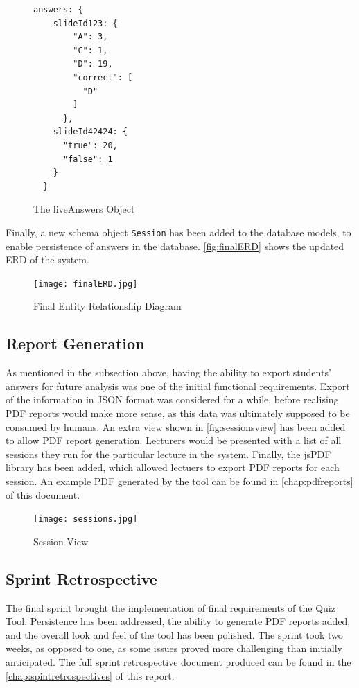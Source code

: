 \begin{figure}[h!]
  \begin{lstlisting}[basicstyle=\small]
  answers: {
    slideId123: {
        "A": 3,
        "C": 1,
        "D": 19,
        "correct": [
          "D"
        ]
      },
    slideId42424: {
      "true": 20,
      "false": 1
    }
  }
  \end{lstlisting}
  \caption{The liveAnswers Object}
  \label{fig:answers}
\end{figure}

\newpage
Finally, a new schema object \texttt{Session} has been added to the database models,
to enable persistence of answers in the database. \autoref{fig:finalERD} shows the
updated ERD of the system.

\begin{figure}[h!]
    \centering
    \texttt{[image: finalERD.jpg]}
    \caption{Final Entity Relationship Diagram}
    \label{fig:finalERD}
\end{figure}

\subsection{Report Generation}
As mentioned in the subsection above, having the ability to export students' answers
for future analysis was one of the initial functional requirements. Export of
the information in JSON format was considered for a while, before realising PDF reports would
make more sense, as this data was ultimately supposed to be consumed by humans.
An extra view shown in \autoref{fig:sessionsview} has been added to allow PDF report generation.
Lecturers would be presented with a list of all sessions they run for the particular
lecture in the system. Finally, the jsPDF\cite{57} library has been added, which allowed
lectuers to export PDF reports for each session. An example PDF generated by the
tool can be found in \autoref{chap:pdfreports} of this document.

\begin{figure}[h!]
    \centering
    \texttt{[image: sessions.jpg]}
    \caption{Session View}
    \label{fig:sessionsview}
\end{figure}

\newpage
\subsection{Sprint Retrospective}
The final sprint brought the implementation of final requirements of the Quiz Tool.
Persistence has been addressed, the ability to generate PDF reports added, and
the overall look and feel of the tool has been polished. The sprint took two weeks,
as opposed to one, as some issues proved more challenging than initially anticipated.
The full sprint retrospective document produced can be found in the
\autoref{chap:spintretrospectives} of this report.

